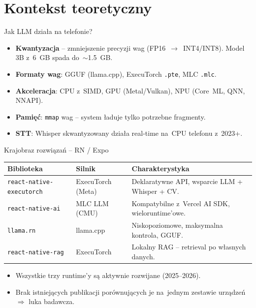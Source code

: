 \documentclass[aspectratio=169,11pt]{beamer}
\begin{document}
\section{Kontekst teoretyczny}

\begin{frame}{Jak LLM działa na telefonie?}
  \begin{itemize}
    \item \textbf{Kwantyzacja} -- zmniejszenie precyzji wag (FP16~$\to$~INT4/INT8).
          Model 3B z~6~GB spada do~$\sim$1.5~GB.
    \item \textbf{Formaty wag}: GGUF (llama.cpp), ExecuTorch \texttt{.pte}, MLC \texttt{.mlc}.
    \item \textbf{Akceleracja}: CPU z~SIMD, GPU (Metal/Vulkan), NPU (Core~ML, QNN, NNAPI).
    \item \textbf{Pamięć}: \texttt{mmap} wag -- system ładuje tylko potrzebne fragmenty.
    \item \textbf{STT}: Whisper skwantyzowany działa real-time na~CPU telefonu z~2023+.
  \end{itemize}
\end{frame}

\begin{frame}{Krajobraz rozwiązań -- RN / Expo}
  \small
  \begin{tabularx}{\textwidth}{@{}l l X@{}}
    \toprule
    \textbf{Biblioteka} & \textbf{Silnik} & \textbf{Charakterystyka} \\
    \midrule
    \texttt{react-native-executorch} & ExecuTorch (Meta) & Deklaratywne API, wsparcie LLM + Whisper + CV. \\
    \texttt{react-native-ai}          & MLC LLM (CMU)     & Kompatybilne z~Vercel AI SDK, wielorun\-time'owe. \\
    \texttt{llama.rn}                 & llama.cpp         & Niskopoziomowe, maksymalna kontrola, GGUF. \\
    \texttt{react-native-rag}         & ExecuTorch        & Lokalny RAG -- retrieval po własnych danych. \\
    \bottomrule
  \end{tabularx}
  \vspace{1em}
  \begin{itemize}
    \item Wszystkie trzy runtime'y są aktywnie rozwijane (2025--2026).
    \item Brak istniejących publikacji porównujących je na~jednym zestawie urządzeń $\Rightarrow$ \alert{luka badawcza}.
  \end{itemize}
\end{frame}
\end{document}
